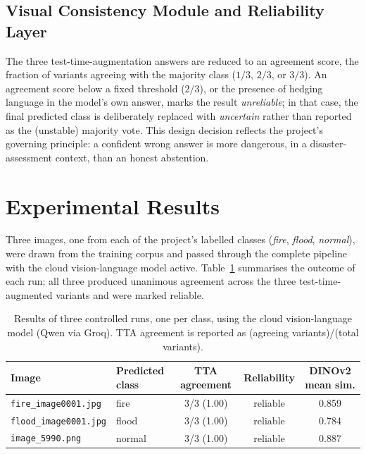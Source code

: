 \documentclass[11pt, a4paper]{article}
\newcommand{\code}[1]{\texttt{\small#1}}
\begin{document}
\subsection{Visual Consistency Module and Reliability Layer}

The three test-time-augmentation answers are reduced to an agreement score, the fraction of
variants agreeing with the majority class ($1/3$, $2/3$, or $3/3$). An agreement score below
a fixed threshold ($2/3$), or the presence of hedging language in the model's own answer, marks
the result \emph{unreliable}; in that case, the final predicted class is deliberately replaced
with \emph{uncertain} rather than reported as the (unstable) majority vote. This design decision
reflects the project's governing principle: a confident wrong answer is more dangerous, in a
disaster-assessment context, than an honest abstention.

\section{Experimental Results}
\label{sec:results}

Three images, one from each of the project's labelled classes (\emph{fire}, \emph{flood},
\emph{normal}), were drawn from the training corpus and passed through the complete pipeline
with the cloud vision-language model active. Table~\ref{tab:results} summarises the outcome of
each run; all three produced unanimous agreement across the three test-time-augmented variants
and were marked reliable.

\begin{table}[h]
\centering\small
\begin{tabular}{llccc}
\toprule
\textbf{Image} & \textbf{Predicted class} & \textbf{TTA agreement} & \textbf{Reliability} & \textbf{DINOv2 mean sim.} \\
\midrule
\code{fire\_image0001.jpg}  & fire   & 3/3 (1.00) & reliable & 0.859 \\
\code{flood\_image0001.jpg} & flood  & 3/3 (1.00) & reliable & 0.784 \\
\code{image\_5990.png}      & normal & 3/3 (1.00) & reliable & 0.887 \\
\bottomrule
\end{tabular}
\caption{Results of three controlled runs, one per class, using the cloud vision-language model
(Qwen via Groq). TTA agreement is reported as (agreeing variants)/(total variants).}
\label{tab:results}
\end{table}
\end{document}

